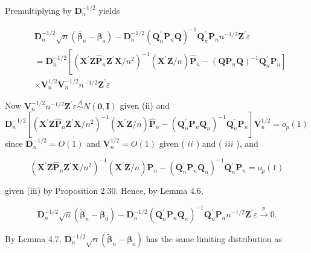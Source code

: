 \documentclass[10pt]{article}
\begin{document}
Premultiplying by $\mathbf{D}_{n}^{-1 / 2}$ yields

$$
\begin{aligned}
& \mathbf{D}_{n}^{-1 / 2} \sqrt{n}\left(\overline{\boldsymbol{\beta}}_{n}-\boldsymbol{\beta}_{o}\right)-\mathbf{D}_{n}^{-1 / 2}\left(\mathbf{Q}_{n}^{\prime} \mathbf{P}_{n} \mathbf{Q}\right)^{-1} \mathbf{Q}_{n}^{\prime} \mathbf{P}_{n} n^{-1 / 2} \mathbf{Z}^{\prime} \varepsilon \\
&=\mathbf{D}_{n}^{-1 / 2}\left[\left(\mathbf{X}^{\prime} \mathbf{Z} \hat{\mathbf{P}}_{n} \mathbf{Z}^{\prime} \mathbf{X} / n^{2}\right)^{-1}\left(\mathbf{X}^{\prime} \mathbf{Z} / n\right) \hat{\mathbf{P}}_{n}-\right.\left.\left(\mathbf{Q} \mathbf{P}_{n} \mathbf{Q}\right)^{-1} \mathbf{Q}_{n}^{\prime} \mathbf{P}_{n}\right] \\
& \times \mathbf{V}_{n}^{1 / 2} \mathbf{V}_{n}^{-1 / 2} n^{-1 / 2} \mathbf{Z}^{\prime} \varepsilon
\end{aligned}
$$

Now $\mathbf{V}_{n}^{-1 / 2} n^{-1 / 2} \mathbf{Z}^{\prime} \varepsilon \stackrel{A}{\sim} N(\mathbf{0}, \mathbf{I})$ given (ii) and\\
$\mathbf{D}_{n}^{-1 / 2}\left[\left(\mathbf{X}^{\prime} \mathbf{Z} \hat{\mathbf{P}}_{n} \mathbf{Z}^{\prime} \mathbf{X} / n^{2}\right)^{-1}\left(\mathbf{X}^{\prime} \mathbf{Z} / n\right) \hat{\mathbf{P}}_{n}-\left(\mathbf{Q}_{n}^{\prime} \mathbf{P}_{n} \mathbf{Q}_{n}\right)^{-1} \mathbf{Q}_{n}^{\prime} \mathbf{P}_{n}\right] \mathbf{V}_{n}^{1 / 2}=o_{p}(1)$\\
since $\mathbf{D}_{n}^{-1 / 2}=O(1)$ and $\mathbf{V}_{n}^{1 / 2}=O(1)$ given ( $i i$ ) and ( $i i i$ ), and

$$
\left(\mathbf{X}^{\prime} \mathbf{Z} \hat{\mathbf{P}}_{n} \mathbf{Z}^{\prime} \mathbf{X} / n^{2}\right)^{-1}\left(\mathbf{X}^{\prime} \mathbf{Z} / n\right) \hat{\mathbf{P}}_{n}-\left(\mathbf{Q}_{n}^{\prime} \mathbf{P}_{n} \mathbf{Q}_{n}\right)^{-1} \mathbf{Q}_{n}^{\prime} \mathbf{P}_{n}=o_{p}(1)
$$

given (iii) by Proposition 2.30. Hence, by Lemma 4.6,

$$
\mathbf{D}_{n}^{-1 / 2} \sqrt{n}\left(\tilde{\boldsymbol{\beta}}_{n}-\boldsymbol{\beta}_{0}\right)-\mathbf{D}_{n}^{-1 / 2}\left(\mathbf{Q}_{n}^{\prime} \mathbf{P}_{n} \mathbf{Q}_{n}\right)^{-1} \mathbf{Q}_{n}^{\prime} \mathbf{P}_{n} n^{-1 / 2} \mathbf{Z}^{\prime} \varepsilon \xrightarrow{p} 0 .
$$

By Lemma 4.7, $\mathbf{D}_{n}^{-1 / 2} \sqrt{n}\left(\tilde{\boldsymbol{\beta}}_{n}-\boldsymbol{\beta}_{o}\right)$ has the same limiting distribution as
\end{document}
